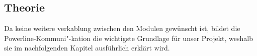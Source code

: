 %
\subsection{Theorie}
Da keine weitere verkablung zwischen den Modulen gewünscht ist, bildet die Powerline-Kommuni"-kation die wichtigste Grundlage für unser Projekt, weshalb sie im nachfolgenden Kapitel ausführlich erklärt wird. 
